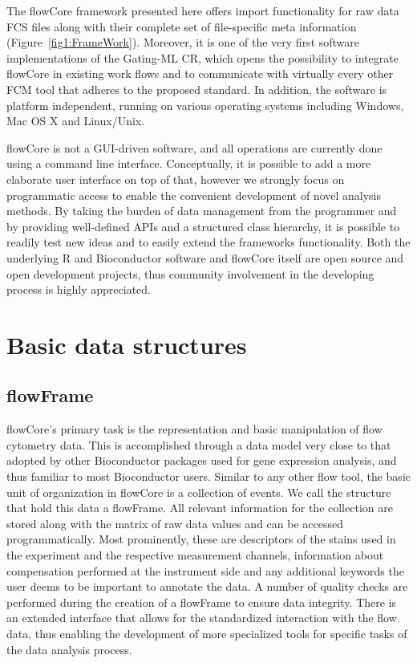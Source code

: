 \documentclass[12pt]{article}
\begin{document}
The flowCore framework presented here offers import functionality for
raw data FCS files along with their complete set of file-specific meta
information (Figure~\ref{fig1:FrameWork}).  Moreover, it is one of the
very first software implementations of the Gating-ML CR, which opens
the possibility to integrate flowCore in existing work flows and to
communicate with virtually every other FCM tool that adheres to the
proposed standard. In addition, the software is platform independent,
running on various operating systems including Windows, Mac OS X and
Linux/Unix.

flowCore is not a GUI-driven software, and all operations are
currently done using a command line interface. Conceptually, it is
possible to add a more elaborate user interface on top of that,
however we strongly focus on programmatic access to enable the
convenient development of novel analysis methods. By taking the burden
of data management from the programmer and by providing well-defined
APIs and a structured class hierarchy, it is possible to readily test
new ideas and to easily extend the frameworks functionality. Both the
underlying R and Bioconductor software and flowCore itself are open
source and open development projects, thus community involvement in the
developing process is highly appreciated.



\section*{Basic data structures}
\subsection*{flowFrame}
flowCore's primary task is the representation and basic manipulation
of flow cytometry data. This is accomplished through a data model very
close to that adopted by other Bioconductor packages used for gene
expression analysis, and thus familiar to most Bioconductor
users. Similar to any other flow tool, the basic unit of organization
in flowCore is a collection of events. We call the structure that hold
this data a flowFrame. All relevant information for the collection are
stored along with the matrix of raw data values and can be accessed
programmatically. Most prominently, these are descriptors of the
stains used in the experiment and the respective measurement channels,
information about compensation performed at the instrument side and
any additional keywords the user deems to be important to annotate the
data. A number of quality checks are performed during the creation of
a flowFrame to ensure data integrity. There is an extended interface
that allows for the standardized interaction with the flow data, thus
enabling the development of more specialized tools for specific tasks
of the data analysis process.
\end{document}
